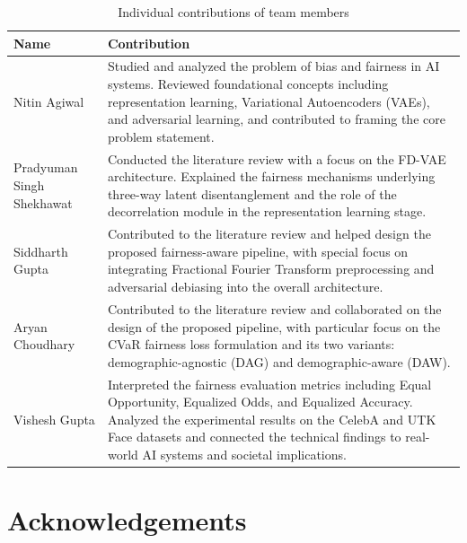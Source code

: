 \documentclass[a4paper,12pt,twoside]{report}
\begin{document}
\begin{table}[h]
\centering
\renewcommand{\arraystretch}{1.3}
\begin{tabular}{p{3cm} p{11cm}}
\hline
\textbf{Name} & \textbf{Contribution} \\
  \hline
  Nitin Agiwal &
  Studied and analyzed the problem of bias and fairness in AI systems. Reviewed foundational concepts including representation learning, Variational Autoencoders (VAEs), and adversarial learning, and contributed to framing the core problem statement. \\

  Pradyuman Singh Shekhawat &
  Conducted the literature review with a focus on the FD-VAE architecture. Explained the fairness mechanisms underlying three-way latent disentanglement and the role of the decorrelation module in the representation learning stage. \\

  Siddharth Gupta &
  Contributed to the literature review and helped design the proposed fairness-aware pipeline, with special focus on integrating Fractional Fourier Transform preprocessing and adversarial debiasing into the overall architecture. \\

  Aryan Choudhary &
  Contributed to the literature review and collaborated on the design of the proposed pipeline, with particular focus on the CVaR fairness loss formulation and its two variants: demographic-agnostic (DAG) and demographic-aware (DAW). \\

  Vishesh Gupta &
  Interpreted the fairness evaluation metrics including Equal Opportunity, Equalized Odds, and Equalized Accuracy. Analyzed the experimental results on the CelebA and UTK Face datasets and connected the technical findings to real-world AI systems and societal implications. \\
  \hline
\end{tabular}
\caption{Individual contributions of team members}
\label{tab:contributions}
\end{table}

\cleardoublepage
\chapter*{Acknowledgements}
\label{ch:acknowledgements}
\end{document}
